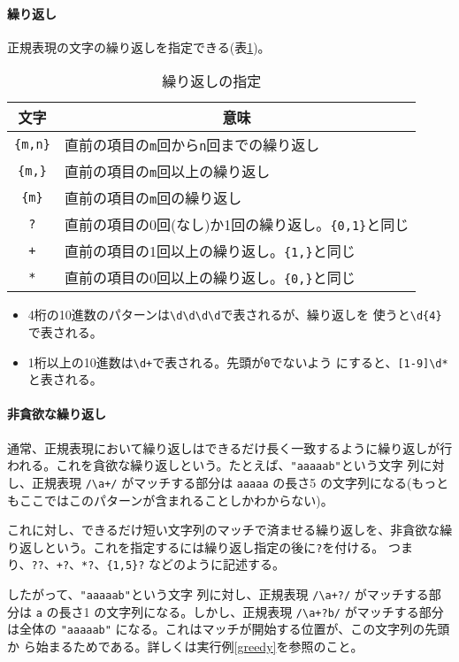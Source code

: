 \paragraph{繰り返し}
正規表現の文字の繰り返しを指定できる(表\ref{repeat})。
\begin{table}[ht]
\caption{繰り返しの指定}\label{repeat}
\begin{center}
 \begin{tabular}{|c|l|}\hline
  文字&\multicolumn{1}{c|}{意味}\\\hline
\Verb+{m,n}+&直前の項目の\texttt{m}回から\texttt{n}回までの繰り返し\\\hline
\Verb+{m,}+&直前の項目の\texttt{m}回以上の繰り返し\\\hline
\Verb+{m}+&直前の項目の\texttt{m}回の繰り返し\\\hline
\Verb+?+&直前の項目の0回(なし)か1回の繰り返し。\Verb+{0,1}+と同じ\\\hline
\Verb-+-&直前の項目の1回以上の繰り返し。\Verb+{1,}+と同じ\\\hline
\Verb+*+&直前の項目の0回以上の繰り返し。\Verb+{0,}+と同じ\\\hline
\end{tabular}
\end{center}
\end{table}
\begin{itemize}
 \item 4桁の10進数のパターンは\Verb+\d\d\d\d+で表されるが、繰り返しを
       使うと\Verb+\d{4}+で表される。
 \item 1桁以上の10進数は\Verb-\d+-で表される。先頭が\texttt{0}でないよう
       にすると、\Verb+[1-9]\d*+と表される。
\end{itemize}
\paragraph{非貪欲な繰り返し}
通常、正規表現において繰り返しはできるだけ長く一致するように繰り返しが行
われる。これを貪欲な繰り返しという。たとえば、\Verb+"aaaaab"+という文字
列に対し、正規表現 \Verb-/\a+/- がマッチする部分は \Verb+aaaaa+ の長さ5
の文字列になる(もっともここではこのパターンが含まれることしかわからない)。

これに対し、できるだけ短い文字列のマッチで済ませる繰り返しを、非貪欲な繰
り返しという。これを指定するには繰り返し指定の後に\Verb+?+を付ける。
つまり、\Verb-??-、\Verb-+?-、\Verb-*?-、\Verb-{1,5}?- などのように記述する。

したがって、\Verb+"aaaaab"+という文字
列に対し、正規表現 \Verb-/\a+?/- がマッチする部分は \Verb+a+ の長さ1
の文字列になる。しかし、正規表現 \Verb-/\a+?b/- がマッチする部分は全体の
\Verb+"aaaaab"+ になる。これはマッチが開始する位置が、この文字列の先頭か
ら始まるためである。詳しくは実行例\ref{greedy}を参照のこと。


